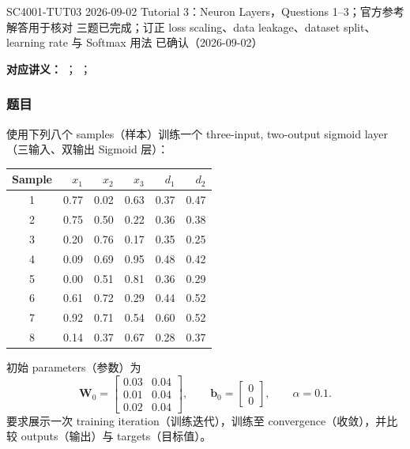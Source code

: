 
\label{tutorial:SC4001-TUT03}

\tutorialmeta
  {SC4001-TUT03}
  {2026-09-02}
  {Tutorial 3：Neuron Layers，Questions 1--3；官方参考解答用于核对}
  {三题已完成；订正 loss scaling、data leakage、dataset split、learning rate 与 Softmax 用法}
  {已确认（2026-09-02）}


\textbf{对应讲义：}
；
；

\subsubsection*{题目}

使用下列八个 samples（样本）训练一个 three-input, two-output sigmoid layer（三输入、双输出 Sigmoid 层）：
\begin{center}
\small
\begin{tabular}{@{}crrrrr@{}}
  \toprule
  Sample & $x_1$ & $x_2$ & $x_3$ & $d_1$ & $d_2$ \\
  \midrule
  1 & 0.77 & 0.02 & 0.63 & 0.37 & 0.47 \\
  2 & 0.75 & 0.50 & 0.22 & 0.36 & 0.38 \\
  3 & 0.20 & 0.76 & 0.17 & 0.35 & 0.25 \\
  4 & 0.09 & 0.69 & 0.95 & 0.48 & 0.42 \\
  5 & 0.00 & 0.51 & 0.81 & 0.36 & 0.29 \\
  6 & 0.61 & 0.72 & 0.29 & 0.44 & 0.52 \\
  7 & 0.92 & 0.71 & 0.54 & 0.60 & 0.52 \\
  8 & 0.14 & 0.37 & 0.67 & 0.28 & 0.37 \\
  \bottomrule
\end{tabular}
\end{center}
初始 parameters（参数）为
\[
  \bm W_0=
  \begin{bmatrix}
    0.03&0.04\\
    0.01&0.04\\
    0.02&0.04
  \end{bmatrix},\qquad
  \bm b_0=\begin{bmatrix}0\\0\end{bmatrix},\qquad
  \alpha=0.1.
\]
要求展示一次 training iteration（训练迭代），训练至 convergence（收敛），并比较 outputs（输出）与 targets（目标值）。


